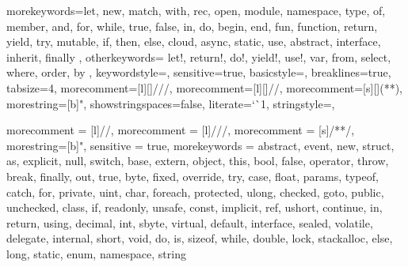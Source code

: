 %
%

\usepackage{hyperref}
\usepackage{graphicx}
\usepackage[margin=2cm]{geometry}
\usepackage{listings}
\usepackage{color}
\usepackage[utf8x]{inputenc}
\usepackage{enumitem}



\usepackage{upquote} %

%
{morekeywords={let, new, match, with, rec, open, module, namespace, type, of, member, %
and, for, while, true, false, in, do, begin, end, fun, function, return, yield, try, %
mutable, if, then, else, cloud, async, static, use, abstract, interface, inherit, finally },
	otherkeywords={ let!, return!, do!, yield!, use!, var, from, select, where, order, by },
    keywordstyle=\color{bluekeywords},
    sensitive=true,
	basicstyle=\ttfamily,
	breaklines=true,
	tabsize=4,
    morecomment=[l][\color{greencomments}]{///},
    morecomment=[l][\color{greencomments}]{//},
    morecomment=[s][\color{greencomments}]{{(*}{*)}},
    morestring=[b]",
    showstringspaces=false,
    literate={`}{\`}1,
    stringstyle=\color{redstrings},
}

{
 morecomment = [l]{//}, 
 morecomment = [l]{///},
 morecomment = [s]{/*}{*/},
 morestring=[b]", 
 sensitive = true,
 morekeywords = {abstract,  event,  new,  struct,
   as,  explicit,  null,  switch,
   base,  extern,  object,  this,
   bool,  false,  operator,  throw,
   break,  finally,  out,  true,
   byte,  fixed,  override,  try,
   case,  float,  params,  typeof,
   catch,  for,  private,  uint,
   char,  foreach,  protected,  ulong,
   checked,  goto,  public,  unchecked,
   class,  if,  readonly,  unsafe,
   const,  implicit,  ref,  ushort,
   continue,  in,  return,  using,
   decimal,  int,  sbyte,  virtual,
   default,  interface,  sealed,  volatile,
   delegate,  internal,  short,  void,
   do,  is,  sizeof,  while,
   double,  lock,  stackalloc,   
   else,  long,  static,   
   enum,  namespace,  string}
}

\lstset{
language=FSharp,
basicstyle=\ttfamily,
breaklines=true,
columns=fullflexible,
xleftmargin=\parindent,
aboveskip=\bigskipamount,
}